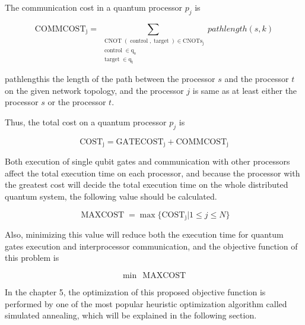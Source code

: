 The communication cost in a quantum processor $p_j$ is 

 \begin{equation}
 \operatorname{COMMCOST_j} = \sum_{ \substack{ \operatorname{CNOT} ( \operatorname{control},  \operatorname{target}) \in  \operatorname{CNOTs_{j}} \\  \operatorname{control} \in  \operatorname{q_s} \\  \operatorname{target} \in  \operatorname{q_t}}} pathlength(s, k)
 \end{equation}
 
pathlengthis the length of the path between the processor $s$ and the processor $t$ on the given network topology, and the processor $j$ is same as at least either the processor $s$ or the processor $t$.

Thus, the total cost on a quantum processor $p_j$ is 

 \begin{equation}
 \operatorname{COST_j} =  \operatorname{GATECOST_j} +  \operatorname{COMMCOST_j}
 \end{equation}

Both execution of single qubit gates and communication with other processors affect the total execution time on each processor, and because the processor with the greatest cost will decide the total execution time on the whole distributed quantum system, the following value should be calculated.

 \begin{equation}
 \operatorname{MAXCOST} = \max \{ \operatorname{COST_j} | 1 \leq j \leq N\}
 \end{equation}

Also, minimizing this value will reduce both the execution time for quantum gates execution and interprocessor communication, and the objective function of this problem is 

 \begin{equation}
  \operatorname{min}\, \operatorname{MAXCOST}
  \end{equation}
  
  In the chapter 5, the optimization of this proposed objective function is performed by one of the most popular heuristic optimization algorithm called simulated annealing, which will be explained in the following section.

\newpage

